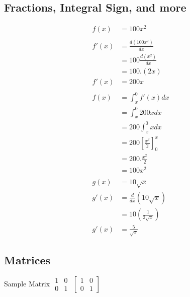 \documentclass{article}
\begin{document}
\subsection{Fractions, Integral Sign, and more}
\allowdisplaybreaks %
\begin{align}
    f(x)  & = 100x^2                                    \\\nonumber\\
    f'(x) & =  \frac{d(100x^2)}{dx} \nonumber           \\
          & = 100\frac{d(x^2)}{dx}\nonumber             \\
          & =100.(2x)\nonumber                          \\
    f'(x) & =200x                                       \\\nonumber\\
    f(x)  & =\int^0_x f'(x)dx\nonumber                  \\
          & =\int^0_x 200x dx\nonumber                  \\
          & =200\int^0_x x dx\nonumber                  \\
          & =200\left[\frac{x^2}{2}\right]^x_0\nonumber \\
          & =200.\frac{x^2}{2}\nonumber                 \\
          & =100x^2                                     \\\nonumber\\
    g(x)  & =10\sqrt{x}                                 \\
    g'(x) & =\frac{d}{dx}  \left(10\sqrt{x}\right)      \\
          & =   10 \left(\frac{1}{2\sqrt{x}}\right)     \\
    g'(x) & =\frac{5}{\sqrt{x}}
\end{align}

\subsection{Matrices}
Sample Matrix\newline
$\begin{matrix}
        1 & 0 \\
        0 & 1
    \end{matrix}$
$\left[\begin{matrix}
            1 & 0 \\
            0 & 1
        \end{matrix}\right]$
\end{document}

